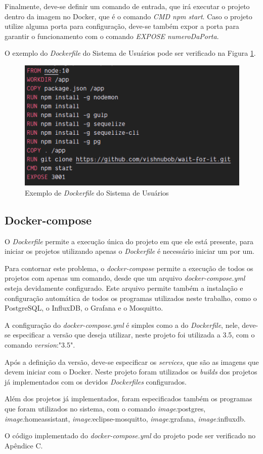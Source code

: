 Finalmente, deve-se definir um comando de entrada, que irá executar o projeto dentro da imagem no Docker, que é o comando \textit{CMD npm start}. Caso o projeto utilize alguma porta para configuração, deve-se também expor a porta para garantir o funcionamento com o comando \textit {EXPOSE numeroDaPorta}.

O exemplo do \textit{Dockerfile} do Sistema de Usuários pode ser verificado na Figura \ref{fig:dockerfile}.

\begin{figure}[htbp]
	\centering
	\includegraphics[width=0.7\linewidth]{figuras/dockerfile.png}
	\caption{Exemplo de \textit{Dockerfile} do Sistema de Usuários}
	\label{fig:dockerfile}
\end{figure}

\subsection{Docker-compose}

O \textit{Dockerfile} permite a execução única do projeto em que ele está presente, para iniciar os projetos utilizando apenas o \textit{Dockerfile} é necessário iniciar um por um.

Para contornar este problema, o \textit{docker-compose} permite a execução de todos os projetos com apenas um comando, desde que um arquivo \textit{docker-compose.yml} esteja devidamente configurado. Este arquivo permite também a instalação e configuração automática de todos os programas utilizados neste trabalho, como o PostgreSQL, o InfluxDB, o Grafana e o Mosquitto.

A configuração do \textit{docker-compose.yml} é simples como a do \textit{Dockerfile}, nele, deve-se especificar a versão que deseja utilizar, neste projeto foi utilizada a 3.5, com o comando \textit{version}:"3.5".

Após a definição da versão, deve-se especificar os \textit{services}, que são as imagens que devem iniciar com o Docker. Neste projeto foram utilizados os \textit{builds} dos projetos já implementados com os devidos \textit{Dockerfiles} configurados. 

Além dos projetos já implementados, foram especificados também os programas que foram utilizados no sistema, com o comando \textit{image:}postgres, \textit{image:}homeassistant, \textit{image:}eclipse-mosquitto, \textit{image:}grafana, \textit{image:}influxdb.

O código implementado do \textit{docker-compose.yml} do projeto pode ser verificado no Apêndice C.



